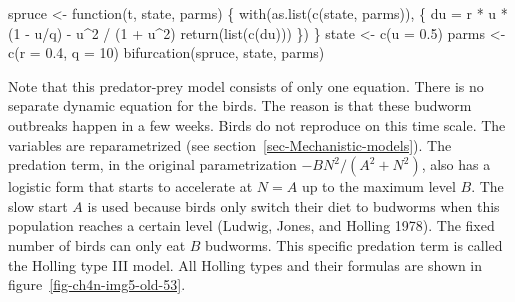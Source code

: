 \documentclass[
  a4paper,
  DIV=11,
  numbers=noendperiod,
  oneside]{scrreprt}
\newenvironment{Shaded}{}{}
\newcommand{\AttributeTok}[1]{\textcolor[rgb]{0.84,0.23,0.29}{#1}}
\newcommand{\ControlFlowTok}[1]{\textcolor[rgb]{0.84,0.23,0.29}{#1}}
\newcommand{\DecValTok}[1]{\textcolor[rgb]{0.00,0.36,0.77}{#1}}
\newcommand{\FloatTok}[1]{\textcolor[rgb]{0.00,0.36,0.77}{#1}}
\newcommand{\FunctionTok}[1]{\textcolor[rgb]{0.44,0.26,0.76}{#1}}
\newcommand{\NormalTok}[1]{\textcolor[rgb]{0.14,0.16,0.18}{#1}}
\newcommand{\OtherTok}[1]{\textcolor[rgb]{0.44,0.26,0.76}{#1}}
\newcommand{\SpecialCharTok}[1]{\textcolor[rgb]{0.00,0.36,0.77}{#1}}
\begin{document}
\begin{Shaded}
\begin{Highlighting}[]
\NormalTok{spruce }\OtherTok{\textless{}{-}} \ControlFlowTok{function}\NormalTok{(t, state, parms) \{}
  \FunctionTok{with}\NormalTok{(}\FunctionTok{as.list}\NormalTok{(}\FunctionTok{c}\NormalTok{(state, parms)), \{}
\NormalTok{    du }\OtherTok{=}\NormalTok{ r }\SpecialCharTok{*}\NormalTok{ u }\SpecialCharTok{*}\NormalTok{ (}\DecValTok{1} \SpecialCharTok{{-}}\NormalTok{ u}\SpecialCharTok{/}\NormalTok{q) }\SpecialCharTok{{-}}\NormalTok{ u}\SpecialCharTok{\^{}}\DecValTok{2} \SpecialCharTok{/}\NormalTok{ (}\DecValTok{1} \SpecialCharTok{+}\NormalTok{ u}\SpecialCharTok{\^{}}\DecValTok{2}\NormalTok{)}
    \FunctionTok{return}\NormalTok{(}\FunctionTok{list}\NormalTok{(}\FunctionTok{c}\NormalTok{(du)))}
\NormalTok{  \})}
\NormalTok{\}}
\NormalTok{state }\OtherTok{\textless{}{-}} \FunctionTok{c}\NormalTok{(}\AttributeTok{u =} \FloatTok{0.5}\NormalTok{)}
\NormalTok{parms }\OtherTok{\textless{}{-}} \FunctionTok{c}\NormalTok{(}\AttributeTok{r =} \FloatTok{0.4}\NormalTok{, }\AttributeTok{q =} \DecValTok{10}\NormalTok{)}
\FunctionTok{bifurcation}\NormalTok{(spruce, state, parms)}
\end{Highlighting}
\end{Shaded}

Note that this predator-prey model consists of only one equation. There
is no separate dynamic equation for the birds. The reason is that these
budworm outbreaks happen in a few weeks. Birds do not reproduce on this
time scale. The variables are reparametrized (see
section~\ref{sec-Mechanistic-models}). The predation term, in the
original parametrization \(- BN^{2}/(A^{2} + N^{2})\), also has a
logistic form that starts to accelerate at \(N = A\) up to the maximum
level \(B\). The slow start \(A\) is used because birds only switch
their diet to budworms when this population reaches a certain level
(Ludwig, Jones, and Holling 1978). The fixed number of birds can only
eat \(B\) budworms. This specific predation term is called the Holling
type III model. All Holling types and their formulas are shown in
figure~\ref{fig-ch4n-img5-old-53}.
\end{document}
